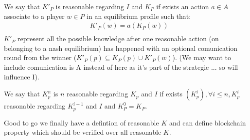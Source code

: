 \begin{mydef}
	We say that $K'_P$ is reasonable regarding $I$ and $K_P$ if exists an action $a \in A$ associate to a player $w \in P$ in an equilibrium profile such that: 	\begin{eqnarray*}	
		& K'_P(w) = a(K_P(w)) \\
	\end{eqnarray*}	
	$K'_P$ represent all the possible knowledge after one reasonable action (on belonging to a nash equilibrium) has happened with an optional comunication round from the winner ($K'_P(p) \subseteq K_P(p) \cup K'_P(w)$).  (We may want to include comunication is A instead of here as it's part of the strategie ... so will influence I).
\end{mydef}

\begin{mydef}
	We say that $K^n_p$ is $n$ reasonable regarding $K_p$ and $I$ if exists $(K^i_p), \forall i \leq n, K^i_p$ reasonable regarding $K^{i-1}_p$ and $I$ and $K^0_P = K_P$.   
\end{mydef}

Good to go we finally have a defintion of reasonable $K$ and can define blockchain property which should be verified over all reasonable $K$.
